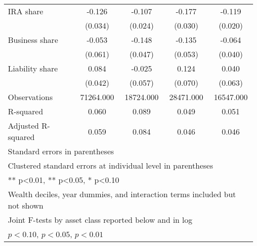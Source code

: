\begin{table}[htbp]
\begin{tabular}{l*{4}{c}}
IRA share &   -0.126\sym{***}&   -0.107\sym{***}&   -0.177\sym{***}&   -0.119\sym{***}\\
          &  (0.034)         &  (0.024)         &  (0.030)         &  (0.020)         \\
Business share&   -0.053         &   -0.148\sym{***}&   -0.135\sym{**} &   -0.064         \\
          &  (0.061)         &  (0.047)         &  (0.053)         &  (0.040)         \\
Liability share&    0.084\sym{**} &   -0.025         &    0.124\sym{*}  &    0.040         \\
          &  (0.042)         &  (0.057)         &  (0.070)         &  (0.063)         \\
\midrule
Observations&71264.000         &18724.000         &28471.000         &16547.000         \\
R-squared &    0.060         &    0.089         &    0.049         &    0.051         \\
Adjusted R-squared&    0.059         &    0.084         &    0.046         &    0.046         \\
\bottomrule
\multicolumn{5}{l}{\footnotesize Standard errors in parentheses}\\
\multicolumn{5}{l}{\footnotesize Clustered standard errors at individual level in parentheses}\\
\multicolumn{5}{l}{\footnotesize *** p<0.01, ** p<0.05, * p<0.10}\\
\multicolumn{5}{l}{\footnotesize Wealth deciles, year dummies, and interaction terms included but not shown}\\
\multicolumn{5}{l}{\footnotesize Joint F-tests by asset class reported below and in log}\\
\multicolumn{5}{l}{\footnotesize \sym{*} \(p<0.10\), \sym{**} \(p<0.05\), \sym{***} \(p<0.01\)}\\
\end{tabular}
\end{table}
